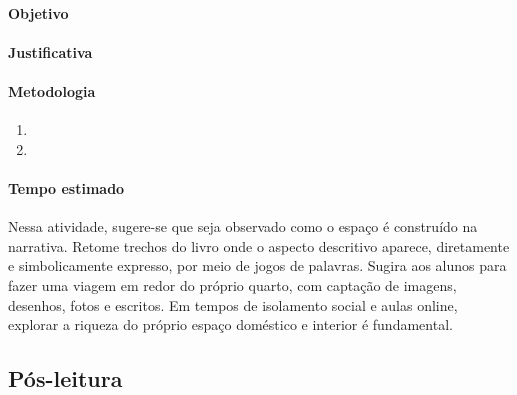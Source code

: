 \documentclass[12pt]{extarticle}
\begin{document}
\paragraph{Objetivo}

\paragraph{Justificativa}

\paragraph{Metodologia}
\begin{enumerate}
	\item
	\item
\end{enumerate}

\paragraph{Tempo estimado}

Nessa atividade, sugere-se que seja observado como o espaço
é construído na narrativa. Retome trechos do livro onde o aspecto
descritivo aparece, diretamente e simbolicamente expresso, por meio de
jogos de palavras. Sugira aos alunos para fazer uma viagem em redor do
próprio quarto, com captação de imagens, desenhos, fotos e escritos. Em
tempos de isolamento social e aulas online, explorar a riqueza do
próprio espaço doméstico e interior é fundamental.

\subsection{Pós-leitura}


\end{document}
